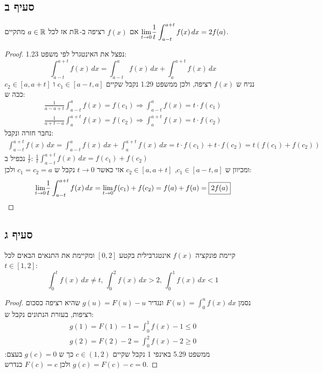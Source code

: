 \documentclass{article}
\begin{document}
	\subsection*{סעיף ב}
	אם $f(x)$ רציפה ב-$\mathbb{R}$ת אז לכל $a \in \mathbb{R}$ מתקיים $\displaystyle{\lim_{t \to 0}}\frac{1}{t}\int_{a-t}^{a+t} f(x) \, dx = 2f(a)$.
	\begin{proof}
		נפצל את האינטגרל לפי משפט 1.23:
		\[
			\int_{a-t}^{a+t} f(x) \, dx
			 = \int_{a-t}^{a} f(x) \, dx + \int_{a}^{a+t} f(x) \, dx
		\]
		נניח ש $f(x)$ רציפה, ולכן ממשפט 1.29 נקבל שקיים $c_1 \in [a-t, a]$ ו $c_2 \in [a, a+t]$ ככה ש:
		\setcounter{equation}{0} \begin{align}
			\frac{1}{a - a + t}\int^a_{a-t} f(x) = f(c_1) \Rightarrow
			\int^a_{a-t} f(x) = t \cdot f(c_1) \\
			\frac{1}{a + t - a}\int^{a+t}_{a} f(x) = f(c_2) \Rightarrow
			\int^{a+t}_{a} f(x) = t \cdot f(c_2)
		\end{align}
		נחבר חזרה ונקבל:
		\begin{align*}
			\int_{a-t}^{a+t} f(x) \, dx
			= \int_{a-t}^{a} f(x) \, dx + \int_{a}^{a+t} f(x) \, dx
			= t \cdot f(c_1) + t \cdot f(c_2) =
			t(f(c_1) + f(c_2))
		\end{align*}
		נכפיל ב $\frac{1}{t}$:
		$\frac{1}{t} \int_{a-t}^{a+t} f(x) \, dx = f(c_1) + f(c_2)$ \\
		ומכיוון ש $c_1 \in [a-t, a]$, $c_2 \in [a, a+t]$ אזי כאשר $t \to 0$ נקבל ש $c_1 = c_2 = a$ ולכן:
		\[
			\displaystyle{\lim_{t \to 0}} \frac{1}{t} \int_{a-t}^{a+t} f(x) \, dx
			= \displaystyle{\lim_{t \to 0}} f(c_1) + f(c_2)
			= f(a) + f(a)
			= \boxed{2f(a)}
		\]
	\end{proof}

	\subsection*{סעיף ג}
	קיימת פונקציה $f(x)$ אינטגרבילית בקטע $[0, 2]$ ומקיימת את התנאים הבאים לכל $t \in [1,2]$:
	\[
		\int^t_0 f(x) \, dx \neq t, \,
		\int^2_0 f(x) \, dx > 2, \,
		\int^1_0 f(x) \, dx < 1
	\]
	\begin{proof}
		נסמן $F(u) = \int^u_0 f(x) \, dx$ ונגדיר $g(u) = F(u) - u$ שהיא רציפה כסכום רציפות,
		בעזרת הנתונים נקבל ש:
		\begin{align*}
			g(1) = F(1) - 1 = \int^1_0 f(x) - 1 \leq 0 \\
			g(2) = F(2) - 2 = \int^2_0 f(x) - 2 \geq 0
		\end{align*}
		ממשפט 5.29 באינפי 1 נקבל שקיים $c \in (1,2)$ כך ש $g(c) = 0$
		בעצם: $g(c) = F(c) - c = 0$ ולכן $F(c) = c$ כנדרש.
	\end{proof}
\end{document}
